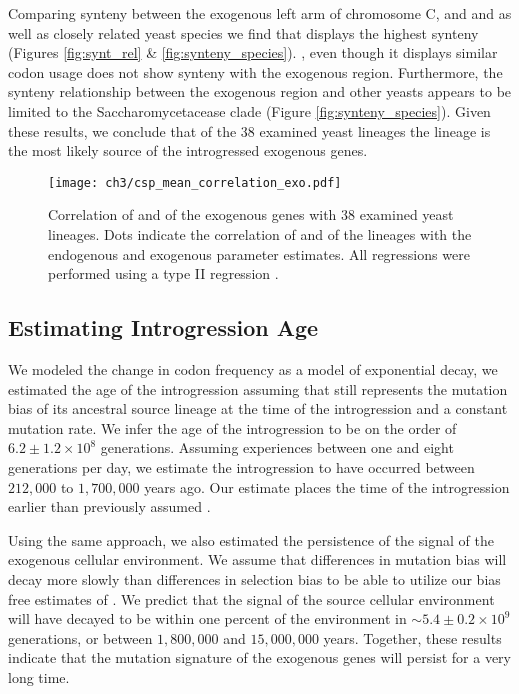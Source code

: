 Comparing synteny between the exogenous left arm of chromosome C, and \gossypii and \dubl as well as closely related yeast species we find that \gossypii displays the highest synteny (Figures \ref{fig:synt_rel} \& \ref{fig:synteny_species}).
\dubl, even though it displays similar codon usage does not show synteny with the exogenous region.
Furthermore, the synteny relationship between the exogenous region and other yeasts appears to be limited to the Saccharomycetacease clade (Figure \ref{fig:synteny_species}).
Given these results, we conclude that of the 38 examined yeast lineages the \gossypii lineage is the most likely source of the introgressed exogenous genes.

\singlespacing
\begin{figure}
     \centering
	\texttt{[image: ch3/csp\_mean\_correlation\_exo.pdf]}
	\caption{Correlation of \DM and \DE of the exogenous genes with 38 examined yeast lineages. 
	Dots indicate the correlation of \DM and \DE of the lineages with the endogenous and exogenous parameter estimates. 
	All regressions were performed using a type II regression \citep{SokalAndRohlf1981}.}
	\label{fig:csp_exo_comp}
\end{figure}
\doublespacing

\subsection{Estimating Introgression Age}

We modeled the change in codon frequency as a model of exponential decay, we estimated the age of the introgression assuming that \gossypii still represents the mutation bias of its ancestral source lineage at the time of the introgression and a constant mutation rate.
We infer the age of the introgression to be on the order of $6.2\pm1.2\times 10^8$ generations. 
Assuming \kluyveri experiences between one and eight generations per day, we estimate the introgression to have occurred between $212,000$ to $1,700,000$ years ago.
Our estimate places the time of the introgression earlier than previously assumed \citep{friedrich2015}.

Using the same approach, we also estimated the persistence of the signal of the exogenous cellular environment.
We assume that differences in mutation bias will decay more slowly than differences in selection bias to be able to utilize our bias free estimates of \DM.
We predict that the \DM signal of the source cellular environment will have decayed to be within one percent of the \kluyveri environment in $\sim 5.4\pm0.2\times 10^9 $ generations, or between $1,800,000$ and $15,000,000$ years.
Together, these results indicate that the mutation signature of the exogenous genes will persist for a very long time.

